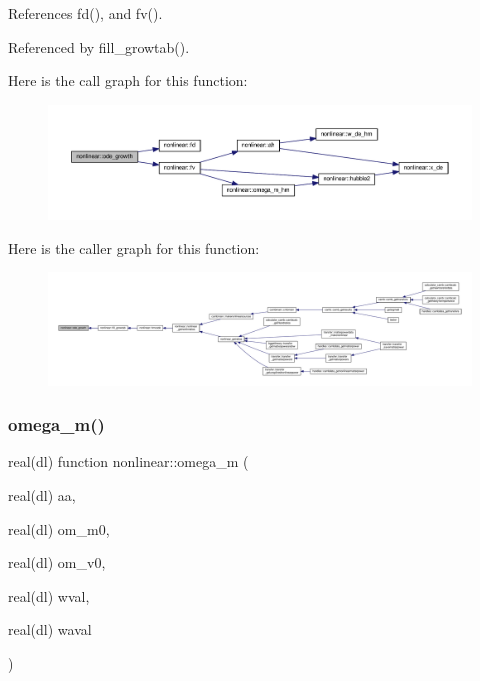 References fd(), and fv().



Referenced by fill\+\_\+growtab().

Here is the call graph for this function\+:
\nopagebreak
\begin{figure}[H]
\begin{center}
\leavevmode
\includegraphics[width=350pt]{namespacenonlinear_a26b787bf515ef27795b9dbbed39b2e34_cgraph}
\end{center}
\end{figure}
Here is the caller graph for this function\+:
\nopagebreak
\begin{figure}[H]
\begin{center}
\leavevmode
\includegraphics[width=350pt]{namespacenonlinear_a26b787bf515ef27795b9dbbed39b2e34_icgraph}
\end{center}
\end{figure}
\mbox{\label{namespacenonlinear_a114a4d8047f3679297cc7b1c216d6517}} 
\subsubsection{\texorpdfstring{omega\+\_\+m()}{omega\_m()}}
{\footnotesize\ttfamily real(dl) function nonlinear\+::omega\+\_\+m (\begin{DoxyParamCaption}\item[{real(dl)}]{aa,  }\item[{real(dl)}]{om\+\_\+m0,  }\item[{real(dl)}]{om\+\_\+v0,  }\item[{real(dl)}]{wval,  }\item[{real(dl)}]{waval }\end{DoxyParamCaption})\hspace{0.3cm}{\ttfamily [private]}}




